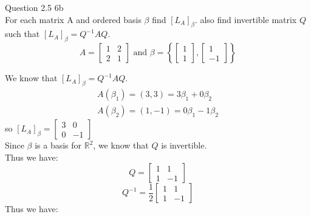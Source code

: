 \documentclass[answers,12pt,addpoints]{exam}
\begin{document}
\begin{questions}
    \question Question 2.5 6b\\
    For each matrix A and ordered basis $\beta$ find $[L_A]_\beta$. also find invertible matrix $Q$ such that $[L_A]_\beta = Q^{-1} A Q$.
    $$ A = \begin{bmatrix}
        1 & 2\\
        2 & 1
    \end{bmatrix} \text{ and } \beta = \left\{ \begin{bmatrix}
        1\\
        1
    \end{bmatrix}, \begin{bmatrix}
        1\\
        -1
    \end{bmatrix}\right\}$$
    \begin{solution}
        We know that $[L_A]_\beta = Q^{-1} A Q$.\\
        \begin{align*}
            A(\beta_1) = (3,3) = 3\beta_1 + 0\beta_2\\
            A(\beta_2) = (1,-1) = 0\beta_1 - 1\beta_2
        \end{align*}
        so $[L_A]_\beta = \begin{bmatrix}
            3 & 0\\
            0 & -1
        \end{bmatrix}$\\
        Since $\beta$ is a basis for $\mathbb{R}^2$, we know that $Q$ is invertible.\\
        Thus we have:
        $$Q = \begin{bmatrix}
            1 & 1\\
            1 & -1
        \end{bmatrix}$$
        $$Q^{-1} = \frac{1}{2}\begin{bmatrix}
            1 & 1\\
            1 & -1
        \end{bmatrix}$$
        Thus we have:


\end{solution}
\end{questions}
\end{document}
